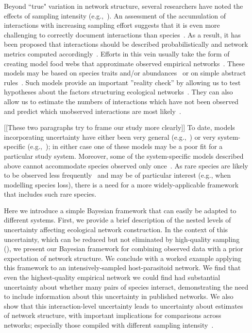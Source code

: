 \documentclass[12pt]{article}
\begin{document}
\begin{spacing}{2.0}
    Beyond ``true" variation in network structure, several researchers have noted the effects of sampling intensity (e.g.,~\citealp{Martinez1999,Bluthgen2006,Bluthgen2007,Jordano2016}). An assessment of the accumulation of interactions with increasing sampling effort suggests that it is even more challenging to correctly document interactions than species~\citep{Guimera2009,Poisot2012,Bartomeus2013,Jordano2016,Giron2018,Graham2018}. As a result, it has been proposed that interactions should be described probabilistically and network metrics computed accordingly~\citep{Bartomeus2013,Poisot2016}. Efforts in this vein usually take the form of creating model food webs that approximate observed empirical networks~\citep{Allesina2008,Guimera2009,Williams2010,Rohr2016}. These models may be based on species traits and/or abundances~\citep{Rohr2016,Weinstein2017,Weinstein2017a,Graham2018} or on simple abstract rules~\citep{Allesina2008,Guimera2009,Williams2010}. Such models provide an important ''reality check'' by allowing us to test hypotheses about the factors structuring ecological networks~\citep{Bartomeus2013,Weinstein2017,Weinstein2017a,Graham2018}. They can also allow us to estimate the numbers of interactions which have not been observed~\citep{Jordano2016,Weinstein2017a} and predict which unobserved interactions are most likely~\citep{Guimera2009,Bartomeus2013}. 


    [[These two paragraphs try to frame our study more clearly]]
    To date, models incorporating uncertainty have either been very general (e.g.,~\citet{Guimera2009,Gravel2013}) or very system-specific (e.g.,~\citet{Bartomeus2013,Weinstein2017,Weinstein2017a,Graham2018}); in either case one of these models may be a poor fit for a particular study system. Moreover, some of the system-specific models described above cannot accommodate species observed only once~\citep{Bartomeus2013,Weinstein2017}. As rare species are likely to be observed less frequently~\citep{Bluthgen2006} and may be of particular interest (e.g., when modelling species loss), there is a need for a more widely-applicable framework that includes such rare species. 


    Here we introduce a simple Bayesian framework that can easily be adapted to different systems. First, we provide a brief description of the nested levels of uncertainty affecting ecological network construction. In the context of this uncertainty, which can be reduced but not eliminated by high-quality sampling (\citealp[see Box 1]{Bartomeus2013}), we present our Bayesian framework for combining observed data with a prior expectation of network structure. We conclude with a worked example applying this framework to an intensively-sampled host-parasitoid network. We find that even the highest-quality empirical network we could find had substantial uncertainty about whether many pairs of species interact, demonstrating the need to include information about this uncertainty in published networks. We also show that this interaction-level uncertainty leads to uncertainty about estimates of network structure, with important implications for comparisons across networks; especially those compiled with different sampling intensity~\citep{Weinstein2017}.



\end{spacing}
\end{document}
